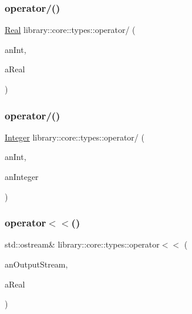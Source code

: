 \subsubsection{\texorpdfstring{operator/()}{operator/()}\hspace{0.1cm}{\footnotesize\ttfamily [1/2]}}
{\footnotesize\ttfamily \mbox{\hyperlink{classlibrary_1_1core_1_1types_1_1_real}{Real}} library\+::core\+::types\+::operator/ (\begin{DoxyParamCaption}\item[{const \mbox{\hyperlink{classlibrary_1_1core_1_1types_1_1_real_a9c5c8826b7e5a8e39544d23fea6c0e1c}{Real\+::\+Value\+Type}} \&}]{an\+Int,  }\item[{const \mbox{\hyperlink{classlibrary_1_1core_1_1types_1_1_real}{Real}} \&}]{a\+Real }\end{DoxyParamCaption})}

\mbox{\label{namespacelibrary_1_1core_1_1types_af520df27ed5123ce801e1d397bfd3234}} 
\subsubsection{\texorpdfstring{operator/()}{operator/()}\hspace{0.1cm}{\footnotesize\ttfamily [2/2]}}
{\footnotesize\ttfamily \mbox{\hyperlink{classlibrary_1_1core_1_1types_1_1_integer}{Integer}} library\+::core\+::types\+::operator/ (\begin{DoxyParamCaption}\item[{const \mbox{\hyperlink{classlibrary_1_1core_1_1types_1_1_integer_a623afb1580f870fd8a1997b1c12c917d}{Integer\+::\+Value\+Type}} \&}]{an\+Int,  }\item[{const \mbox{\hyperlink{classlibrary_1_1core_1_1types_1_1_integer}{Integer}} \&}]{an\+Integer }\end{DoxyParamCaption})}

\mbox{\label{namespacelibrary_1_1core_1_1types_af9123a41f1061b37fc719e25761f33a2}} 
\subsubsection{\texorpdfstring{operator$<$$<$()}{operator<<()}\hspace{0.1cm}{\footnotesize\ttfamily [1/2]}}
{\footnotesize\ttfamily std\+::ostream\& library\+::core\+::types\+::operator$<$$<$ (\begin{DoxyParamCaption}\item[{std\+::ostream \&}]{an\+Output\+Stream,  }\item[{const \mbox{\hyperlink{classlibrary_1_1core_1_1types_1_1_real}{Real}} \&}]{a\+Real }\end{DoxyParamCaption})}

